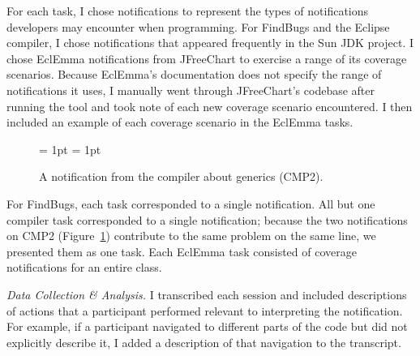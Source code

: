 \documentclass{llncs}
\begin{document}
For each task, I chose notifications to represent the types of notifications developers may encounter when programming.
For FindBugs and the Eclipse compiler, I chose notifications that appeared frequently in the Sun JDK project. I chose EclEmma notifications from JFreeChart to exercise a range of its coverage scenarios. Because EclEmma's documentation does not specify the range of notifications it uses, I manually went through JFreeChart's codebase after running the tool and took note of each new coverage scenario encountered. I then included an example of each coverage scenario in the EclEmma tasks.

\begin{figure} 
	\subfigcapskip = 1pt
	\centering
			\subfigcapskip = 1pt
					
					\caption{A notification from the compiler about generics (CMP2).}
					\label{fig:CMP2} 
\end{figure}

For FindBugs, each task corresponded to a single notification.
All but one compiler task corresponded to a single notification; because the two notifications on CMP2 (Figure~\ref{fig:CMP2}) contribute to the same problem on the same line, we presented them as one task. 
Each EclEmma task consisted of coverage notifications for an entire class. 

\vspace{0.5em}
\noindent\textit{Data Collection \& Analysis.}
I transcribed each session and included descriptions of actions that a participant performed relevant to interpreting the notification. 
For example, if a participant navigated to different parts of the code but did not explicitly describe it, I added a description of that navigation to the transcript.
\end{document}
